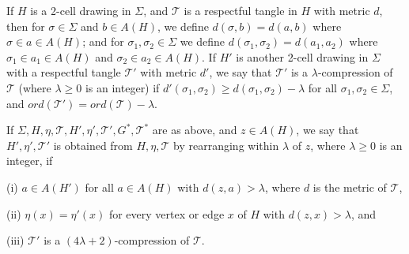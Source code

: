 If $H$ is a 2-cell drawing in $\Sigma$, and $\mathscr{T}$ is a respectful tangle in $H$ with metric $d$, then for $\sigma \in \Sigma$ and $b \in A(H)$, we define $d(\sigma, b) = d(a, b)$ where $\sigma \in a \in A(H)$; and for $\sigma_1, \sigma_2 \in \Sigma$ we define $d(\sigma_1, \sigma_2) = d(a_1, a_2)$ where $\sigma_1 \in a_1 \in A(H)$ and $\sigma_2 \in a_2 \in A(H)$. If $H'$ is another 2-cell drawing in $\Sigma$ with a respectful tangle $\mathscr{T}'$ with metric $d'$, we say that $\mathscr{T}'$ is a $\lambda$-compression of $\mathscr{T}$ (where $\lambda \ge 0$ is an integer) if $d'(\sigma_1, \sigma_2) \ge d(\sigma_1, \sigma_2) - \lambda$ for all $\sigma_1, \sigma_2 \in \Sigma$, and $ord(\mathscr{T}') = ord(\mathscr{T}) - \lambda$.

If $\Sigma, H, \eta, \mathscr{T}, H', \eta', \mathscr{T}', G^*, \mathscr{T}^*$ are as above, and $z \in A(H)$, we say that $H', \eta', \mathscr{T}'$ is obtained from $H, \eta, \mathscr{T}$ by rearranging within $\lambda$ of $z$, where $\lambda \ge 0$ is an integer, if

\hspace*{12pt}(i) $a \in A(H')$ for all $a \in A(H)$ with $d(z, a) > \lambda$, where $d$ is the metric of $\mathscr{T}$,

\hspace*{12pt}(ii) $\eta(x) = \eta'(x)$ for every vertex or edge $x$ of $H$ with $d(z, x) > \lambda$, and

\hspace*{12pt}(iii) $\mathscr{T}'$ is a $(4\lambda + 2)$-compression of $\mathscr{T}$.
